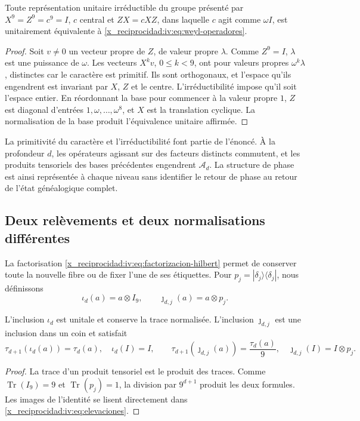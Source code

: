 \begin{theorem}
\label{x_reciprocidad:iv:thm:weyl-unicidad}
Toute représentation unitaire irréductible du groupe présenté par
\(X^9=Z^9=c^9=I\), \(c\) central et \(ZX=cXZ\), dans laquelle
\(c\) agit comme \(\omega I\), est unitairement équivalente à
\eqref{x_reciprocidad:iv:eq:weyl-operadores}.
\end{theorem}
\begin{proof}
Soit \(v\neq0\) un vecteur propre de \(Z\), de valeur propre \(\lambda\). Comme \(Z^9=I\), \(\lambda\) est une puissance de \(\omega\). Les vecteurs \(X^kv\), \(0\leq k<9\), ont pour valeurs propres \(\omega^k\lambda\), distinctes car le caractère est primitif. Ils sont orthogonaux, et l'espace qu'ils engendrent est invariant par \(X\), \(Z\) et le centre. L'irréductibilité impose qu'il soit l'espace entier. En réordonnant la base pour commencer à la valeur propre \(1\), \(Z\) est diagonal d'entrées \(1,\omega,\ldots,\omega^8\), et \(X\) est la translation cyclique. La normalisation de la base produit l'équivalence unitaire affirmée.
\end{proof}

La primitivité du caractère et l’irréductibilité font partie de
l’énoncé. À la profondeur \(d\), les opérateurs agissant sur des facteurs
distincts commutent, et les produits tensoriels des bases précédentes
engendrent \(\mathcal A_d\). La structure de phase est ainsi
représentée à chaque niveau sans identifier le retour de phase au
retour de l’état généalogique complet.

\subsection{Deux relèvements et deux normalisations différentes}

La factorisation \eqref{x_reciprocidad:iv:eq:factorizacion-hilbert} permet de conserver
toute la nouvelle fibre ou de fixer l’une de ses étiquettes. Pour
\(p_j=|\delta_j\rangle\langle\delta_j|\), nous définissons
\begin{equation}
 \iota_d(a)=a\otimes I_9,
 \qquad \jmath_{d,j}(a)=a\otimes p_j.
 \label{x_reciprocidad:iv:eq:elevaciones}
\end{equation}
\begin{proposition}
\label{x_reciprocidad:iv:prop:unidad-traza}
L’inclusion \(\iota_d\) est unitale et conserve la trace normalisée.
L’inclusion \(\jmath_{d,j}\) est une inclusion dans un coin et
satisfait
\[
 \tau_{d+1}(\iota_d(a))=\tau_d(a),\quad \iota_d(I)=I,
 \qquad
 \tau_{d+1}(\jmath_{d,j}(a))=\frac{\tau_d(a)}9,
 \quad \jmath_{d,j}(I)=I\otimes p_j.
\]
\end{proposition}
\begin{proof}
La trace d’un produit tensoriel est le produit des traces.
Comme \(\operatorname{Tr}(I_9)=9\) et
\(\operatorname{Tr}(p_j)=1\), la division par \(9^{d+1}\)
produit les deux formules. Les images de l’identité se lisent
directement dans \eqref{x_reciprocidad:iv:eq:elevaciones}.
\end{proof}

